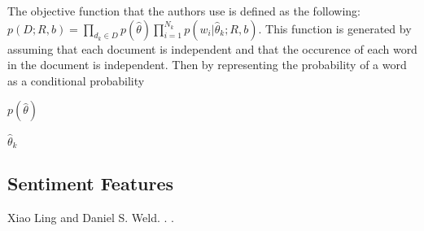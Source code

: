 \documentclass[11pt,letterpaper]{article}
\begin{document}
The objective function that the authors use is defined as the following: $p(D;R,b) = \prod_{d_{k}\in D}^{} p(\hat{\theta}) \prod_{i=1}^{N_{k}} p(w_{i}|\hat{\theta}_{k};R,b)$. This function is generated by assuming that each document is independent and that the occurence of each word in the document is independent. Then by representing the probability of a word as a conditional probability 

$p(\hat{\theta})$

$\hat{\theta}_{k}$


\subsection{Sentiment Features}

\begin{thebibliography}{}

Xiao Ling and Daniel S. Weld.
.
.




\end{thebibliography}
\end{document}
